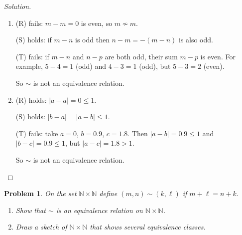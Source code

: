 \documentclass[12pt]{article}
\newtheorem{problem}{Problem}
\newcommand{\NN}{\ensuremath{\mathbb N}}
\begin{document}
\begin{proof}[Solution]
~
\begin{enumerate}[label=(\alph*)]
    \item (R) fails: $m - m = 0$ is even, so $m \not\sim m$.

    (S) holds: if $m - n$ is odd then $n - m = -(m-n)$ is also odd.

    (T) fails: if $m - n$ and $n - p$ are both odd, their sum $m - p$ is even. For example, $5 - 4 = 1$ (odd) and $4 - 3 = 1$ (odd), but $5 - 3 = 2$ (even).

    So $\sim$ is not an equivalence relation.

    \vspace{0.3in}

    \item (R) holds: $|a - a| = 0 \leq 1$.

    (S) holds: $|b - a| = |a - b| \leq 1$.

    (T) fails: take $a = 0$, $b = 0.9$, $c = 1.8$. Then $|a - b| = 0.9 \leq 1$ and $|b - c| = 0.9 \leq 1$, but $|a - c| = 1.8 > 1$.

    So $\sim$ is not an equivalence relation.
\end{enumerate}
\end{proof}

\setcounter{problem}{9}
\begin{problem}
On the set $\NN \times \NN$ define $(m, n) \sim (k, \ell)$ if $m + \ell = n + k$.

\begin{enumerate}[label=(\alph*)]
    \item Show that $\sim$ is an equivalence relation on $\NN \times \NN$.

    \item Draw a sketch of $\NN \times \NN$ that shows several equivalence classes.
\end{enumerate}
\end{problem}
\end{document}
